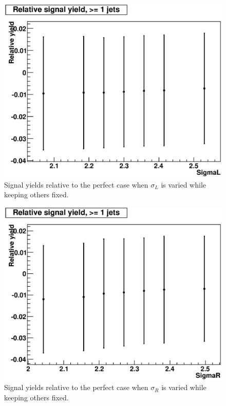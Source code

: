 \documentclass{cmspaper2}
\begin{document}
\begin{figure}[hbtp]
\begin{center}
\includegraphics[width=150mm]{SigmaL_RelativeSignalYieldGood_1}
\caption{Signal yields relative to the perfect case when $\sigma_L$ is varied while keeping others fixed.}
\label{Figure_RelativeYieldChangingSigmaLOnly}
\end{center}
\end{figure}

\begin{figure}[hbtp]
\begin{center}
\includegraphics[width=150mm]{SigmaR_RelativeSignalYieldGood_1}
\caption{Signal yields relative to the perfect case when $\sigma_R$ is varied while keeping others fixed.}
\label{Figure_RelativeYieldChangingSigmaROnly}
\end{center}
\end{figure}
\end{document}
